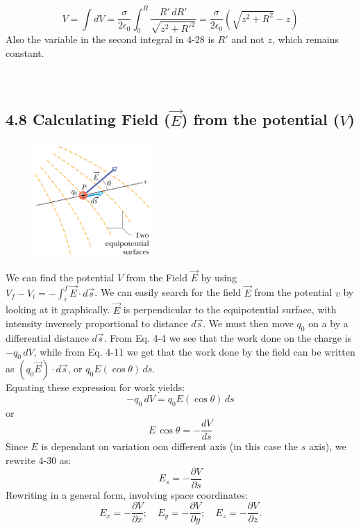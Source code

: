 \documentclass[12pt, a4paper]{article}
\begin{document}
		\[
			V = \int dV = \frac{\sigma}{2\epsilon_0} \int_0^R \frac{R' \, dR'}{\sqrt{z^2 + R'^2}} = \frac{\sigma}{2\epsilon_0} (\sqrt{z^2 + R^2} - z)
			\tag{Charged Disk, 4-28}
		\]
		Also the variable in the second integral in 4-28 is $R'$ and not $z$, which remains constant.
		\\\\\\
		
		
		
		
		\subsection*{4.8 Calculating Field ($\vec{E}$) from the potential ($V$)}

		\begin{figure}
			\centering
			\includegraphics[width=4.5cm]{Physics2_PNGs/charge-in-elec-field.png}
			\caption*{}
			\label{fig:charge-in-elec-field.png}
		\end{figure}
		We can find the potential $V$ from the Field $\vec{E}$ by using \\ 
		$V_f - V_i = - \int_{i}^{f} \vec{E} \cdot d\vec{s}$. We can easily search for the field $\vec{E}$ from the potential $v$ by looking at it graphically. $\vec{E}$ is perpendicular to the equipotential surface, with intensity inversely proportional to distance $d\vec{s}$. We must then move $q_0$ on a by a differential distance $d\vec{s}$. From Eq. 4-4 we see that the work done on the charge is $-q_0 \, dV$, while from Eq. 4-11 we get that the work done by the field can be written as $(q_0\vec{E}) \cdot d\vec{s}$, or $q_0E(\cos\theta)  \, ds$. \\
		Equating these expression for work yields:
		\[
			-q_0 \, dV = q_0E(\cos\theta) \, ds
			\tag{4-29}
		\]
		or
		\[
			E \, \cos\theta = - \frac{dV}{ds}
			\tag{4-30}
		\]
		Since $E$ is dependant on variation oon different axis (in this case the $s$ axis), we rewrite 4-30 as:
		\begin{equation*}
			E_s = - \frac{\partial V}{\partial s}
			\tag{4-31}
		\end{equation*}
		Rewriting in a general form, involving space coordinates:
		\begin{equation*}
			E_x = - \frac{\partial V}{\partial x}; \quad
			E_y = - \frac{\partial V}{\partial y}; \quad
			E_z = - \frac{\partial V}{\partial z}.
			\tag{4-32}
		\end{equation*}
\end{document}
